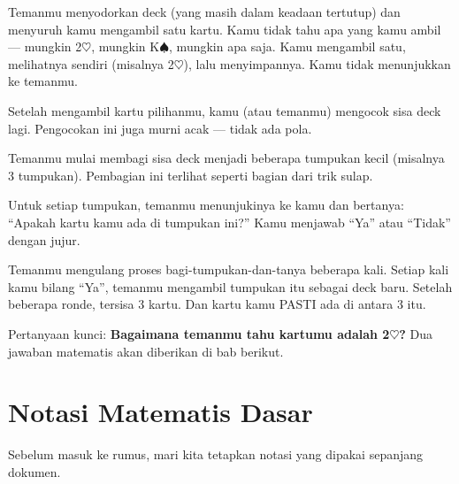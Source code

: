 \documentclass[11pt,a4paper]{article}
\theoremstyle{definition}
\begin{document}
\begin{tahapbox}
Temanmu menyodorkan deck (yang masih dalam keadaan tertutup) dan menyuruh kamu mengambil satu kartu. Kamu tidak tahu apa yang kamu ambil --- mungkin 2$\heartsuit$, mungkin K$\spadesuit$, mungkin apa saja. Kamu mengambil satu, melihatnya sendiri (misalnya 2$\heartsuit$), lalu menyimpannya. Kamu tidak menunjukkan ke temanmu.
\end{tahapbox}

\begin{tahapbox}
Setelah mengambil kartu pilihanmu, kamu (atau temanmu) mengocok sisa deck lagi. Pengocokan ini juga murni acak --- tidak ada pola.
\end{tahapbox}

\begin{tahapbox}
Temanmu mulai membagi sisa deck menjadi beberapa tumpukan kecil (misalnya 3 tumpukan). Pembagian ini terlihat seperti bagian dari trik sulap.
\end{tahapbox}

\begin{tahapbox}
Untuk setiap tumpukan, temanmu menunjukinya ke kamu dan bertanya: ``Apakah kartu kamu ada di tumpukan ini?'' Kamu menjawab ``Ya'' atau ``Tidak'' dengan jujur.
\end{tahapbox}

\begin{tahapbox}
Temanmu mengulang proses bagi-tumpukan-dan-tanya beberapa kali. Setiap kali kamu bilang ``Ya'', temanmu mengambil tumpukan itu sebagai deck baru. Setelah beberapa ronde, tersisa 3 kartu. Dan kartu kamu PASTI ada di antara 3 itu.
\end{tahapbox}

Pertanyaan kunci: \textbf{Bagaimana temanmu tahu kartumu adalah 2$\heartsuit$?} Dua jawaban matematis akan diberikan di bab berikut.

\section{Notasi Matematis Dasar}

Sebelum masuk ke rumus, mari kita tetapkan notasi yang dipakai sepanjang dokumen.
\end{document}
